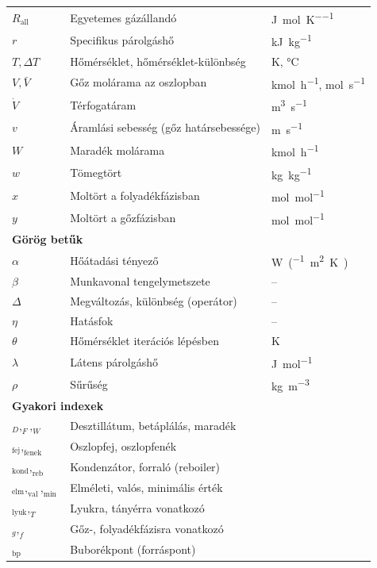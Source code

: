 \begin{center}
\begin{longtable}{l p{} l}
\(R_{\text{all}}\) & Egyetemes gázállandó & \unit{\joule\per\mol\per\kelvin} \\
\(r\) & Specifikus párolgáshő & \unit{\kilo\joule\per\kg} \\
\(T, \Delta T\) & Hőmérséklet, hőmérséklet-különbség & \unit{\kelvin}, \unit{\celsius} \\
\(V, \bar{V}\) & Gőz molárama az oszlopban & \unit{\kmol\per\hour}, \unit{\mol\per\second} \\
\(\dot{V}\) & Térfogatáram & \unit{\cubic\metre\per\second} \\
\(v\) & Áramlási sebesség (gőz határsebessége) & \unit{\metre\per\second} \\
\(W\) & Maradék molárama & \unit{\kmol\per\hour} \\
\(w\) & Tömegtört & \unit{\kg\per\kg} \\
\(x\) & Moltört a folyadékfázisban & \unit{\mol\per\mol} \\
\(y\) & Moltört a gőzfázisban & \unit{\mol\per\mol} \\
\midrule
\multicolumn{3}{l}{\textbf{Görög betűk}} \\
\midrule
\(\alpha\) & Hőátadási tényező & \unit{\watt\per(\square\metre\kelvin)} \\
\(\beta\) & Munkavonal tengelymetszete & -- \\
\(\Delta\) & Megváltozás, különbség (operátor) & -- \\
\(\eta\) & Hatásfok & -- \\
\(\theta\) & Hőmérséklet iterációs lépésben & \unit{\kelvin} \\
\(\lambda\) & Látens párolgáshő & \unit{\joule\per\mol} \\
\(\rho\) & Sűrűség & \unit{\kg\per\cubic\metre} \\
\midrule
\multicolumn{3}{l}{\textbf{Gyakori indexek}} \\
\midrule
\(_D, _F, _W\) & Desztillátum, betáplálás, maradék & \\
\(_{\text{fej}}, _{\text{fenek}}\) & Oszlopfej, oszlopfenék & \\
\(_{\text{kond}}, _{\text{reb}}\) & Kondenzátor, forraló (reboiler) & \\
\(_{\text{elm}}, _{\text{val}}, _{\text{min}}\) & Elméleti, valós, minimális érték & \\
\(_{\text{lyuk}}, _{T}\) & Lyukra, tányérra vonatkozó & \\
\(_{g}, _{f}\) & Gőz-, folyadékfázisra vonatkozó & \\
\(_{\text{bp}}\) & Buborékpont (forráspont) & \\

\end{longtable}
\end{center}